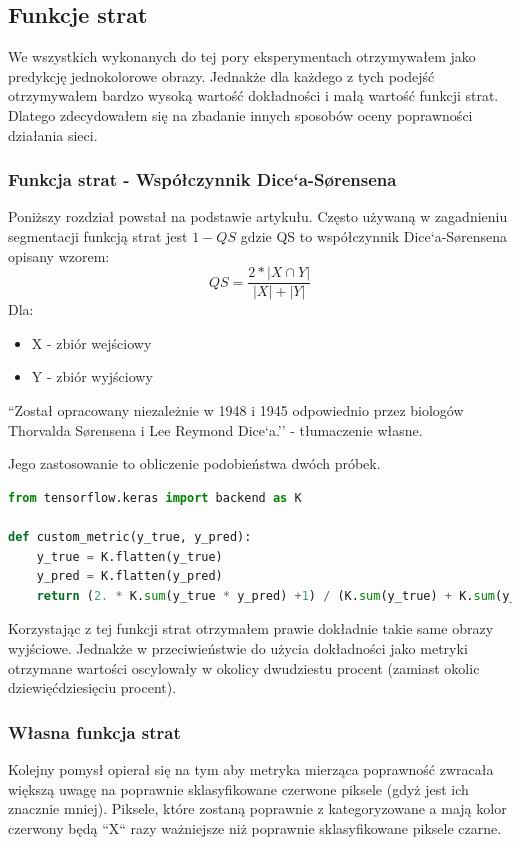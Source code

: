 \documentclass{article}
\begin{document}
\subsection{Funkcje strat}
We wszystkich wykonanych do tej pory eksperymentach otrzymywałem jako predykcję jednokolorowe obrazy.
Jednakże dla każdego z tych podejść otrzymywałem bardzo wysoką wartość dokładności i małą wartość funkcji strat.
Dlatego zdecydowałem się na zbadanie innych sposobów oceny poprawności działania sieci.
\subsubsection{Funkcja strat - Współczynnik Dice`a-Sørensena}
Poniższy rozdział powstał na podstawie artykułu\cite{coefficient}.
Często używaną w zagadnieniu segmentacji funkcją strat jest $1-QS$ gdzie QS to współczynnik Dice`a-Sørensena opisany wzorem:
\begin{equation}
    QS = \frac{2*|X \cap Y|}{|X|+|Y|}
\end{equation}
Dla:
\begin{itemize}
    \item X - zbiór wejściowy
    \item Y - zbiór wyjściowy
\end{itemize}

``Został opracowany niezależnie w 1948 i 1945 odpowiednio przez biologów Thorvalda Sørensena i Lee Reymond Dice`a.''\cite{coefficient} - tłumaczenie własne.

Jego zastosowanie to obliczenie podobieństwa dwóch próbek.

\begin{lstlisting}[caption={Implementacja przy użyciu Keras i TensorFlow},language=python]
from tensorflow.keras import backend as K

def custom_metric(y_true, y_pred):
    y_true = K.flatten(y_true)
    y_pred = K.flatten(y_pred)
    return (2. * K.sum(y_true * y_pred) +1) / (K.sum(y_true) + K.sum(y_pred) + 1)
\end{lstlisting}

Korzystając z tej funkcji strat otrzymałem prawie dokładnie takie same obrazy wyjściowe.
Jednakże w przeciwieństwie do użycia dokładności jako metryki otrzymane wartości oscylowały w okolicy dwudziestu procent (zamiast okolic dziewięćdziesięciu procent).

\subsubsection{Własna funkcja strat}
Kolejny pomysł opierał się na tym aby metryka mierząca poprawność zwracała większą uwagę na poprawnie sklasyfikowane czerwone piksele (gdyż jest ich znacznie mniej).
Piksele, które zostaną poprawnie z kategoryzowane a mają kolor czerwony będą ``X`` razy ważniejsze niż poprawnie sklasyfikowane piksele czarne.
\end{document}
